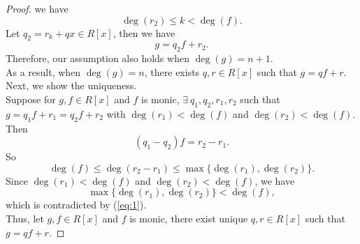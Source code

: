 \documentclass{amsart}
\theoremstyle{plain}
\theoremstyle{definition}
\begin{document}
\begin{proof}
  we have
  \[\deg(r_2) \leq k < \deg(f).\]
  Let $q_2 = r_k+qx \in R[x]$, then we have
 \[g = q_2f+r_2.\]
 Therefore, our assumption also holds when $\deg(g) = n+1$.\\
 As a result, when $\deg(g) =n$, there exists $q,r \in R[x]$ such that $g = qf+r$.\\
 Next, we show the uniqueness.\\ 
 Suppose for $g,f \in R[x]$ and $f$ is monic, $\exists\ q_1,q_2,r_1,r_2$ such that $g = q_1f+r_1 = q_2f+r_2$ with $\deg(r_1)<\deg(f)$ and $\deg(r_2) < \deg(f)$.\\
 Then 
 \[(q_1-q_2)f = r_2-r_1.\]
So
\begin{equation}\label{eq:1}
	\deg(f) \leq \deg(r_2-r_1) \leq \max\{\deg(r_1),\deg(r_2)\}.
\end{equation}
Since $\deg(r_1)<\deg(f)$ and $\deg(r_2) < \deg(f)$, we have
\[\max\{\deg(r_1),\deg(r_2)\} < \deg(f),\]   
  which is contradicted by (\ref{eq:1}).\\
  Thus, let $g,f\in R[x]$ and $f$ is monic, there exist unique $q,r\in R[x]$ such that $g = qf+r$.
\end{proof}  
\end{document}
